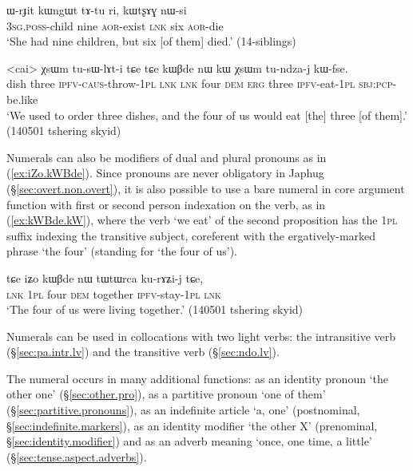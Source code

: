 \begin{exe}
\ex \label{ex:WrJit.kWngWt} 
\gll ɯ-rɟit kɯngɯt tɤ-tu ri, kɯtʂɤɣ nɯ-si \\
\textsc{3sg}.\textsc{poss}-child nine \textsc{aor}-exist \textsc{lnk} six \textsc{aor}-die \\
\glt `She had nine children, but six [of them] died.' (14-siblings) 
\end{exe}

\begin{exe}
\ex \label{ex:kWBde.kW} 
\gll <cai> χsɯm tu-sɯ-lɤt-i tɕe tɕe  kɯβde nɯ kɯ χsɯm tu-ndza-j kɯ-fse. \\
dish three \textsc{ipfv}-\textsc{caus}-throw-\textsc{1pl} \textsc{lnk} \textsc{lnk} four \textsc{dem} \textsc{erg} three \textsc{ipfv}-eat-\textsc{1pl} \textsc{sbj}:\textsc{pcp}-be.like \\
\glt `We used to order three dishes, and the four of us would eat [the] three [of them].' (140501 tshering skyid)
\end{exe}		

Numerals can also be modifiers of dual and plural pronouns as in (\ref{ex:iZo.kWBde}). Since pronouns are never obligatory in Japhug (§\ref{sec:overt.non.overt}), it is also possible to use a bare numeral in core argument function with first or second person indexation on the verb, as in (\ref{ex:kWBde.kW}), where the verb  `we eat' of the second proposition has the \textsc{1pl}  suffix indexing the transitive subject, coreferent with the ergatively-marked phrase  `the four' (standing for  `the four of us').
\largerpage
\begin{exe}
\ex \label{ex:iZo.kWBde} 
\gll tɕe iʑo kɯβde nɯ tɯtɯrca ku-rɤʑi-j tɕe, \\
\textsc{lnk} \textsc{1pl} four \textsc{dem}  together \textsc{ipfv}-stay-\textsc{1pl} \textsc{lnk} \\
\glt `The four of us were living together.' (140501 tshering skyid) 
\end{exe}		

Numerals can be used in collocations with two light verbs: the intransitive verb   (§\ref{sec:pa.intr.lv}) and the transitive verb  (§\ref{sec:ndo.lv}).
 
The numeral  occurs in many additional functions: as an identity pronoun `the other one' (§\ref{sec:other.pro}), as a partitive pronoun `one of them' (§\ref{sec:partitive.pronouns}), as an indefinite article `a, one' (postnominal, §\ref{sec:indefinite.markers}), as an identity modifier `the other X' (prenominal, §\ref{sec:identity.modifier}) and  as an adverb meaning `once, one time, a little' (§\ref{sec:tense.aspect.adverbs}).
 
